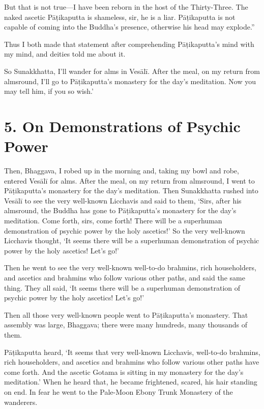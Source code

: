 \documentclass[12pt,openany]{book}%
\begin{document}
But that is not true—I have been reborn in the host of the Thirty-Three. The naked ascetic \textsanskrit{Pāṭikaputta} is shameless, sir, he is a liar. \textsanskrit{Pāṭikaputta} is not capable of coming into the Buddha’s presence, otherwise his head may explode.” 

Thus I both made that statement after comprehending \textsanskrit{Pāṭikaputta}’s mind with my mind, and deities told me about it. 

So Sunakkhatta, I’ll wander for alms in \textsanskrit{Vesālī}. After the meal, on my return from almsround, I’ll go to \textsanskrit{Pāṭikaputta}’s monastery for the day’s meditation. Now you may tell him, if you so wish.’ 

\section*{5. On Demonstrations of Psychic Power }

Then, Bhaggava, I robed up in the morning and, taking my bowl and robe, entered \textsanskrit{Vesālī} for alms. After the meal, on my return from almsround, I went to \textsanskrit{Pāṭikaputta}’s monastery for the day’s meditation. Then Sunakkhatta rushed into \textsanskrit{Vesālī} to see the very well-known Licchavis and said to them, ‘Sirs, after his almsround, the Buddha has gone to \textsanskrit{Pāṭikaputta}’s monastery for the day’s meditation. Come forth, sirs, come forth! There will be a superhuman demonstration of psychic power by the holy ascetics!’ So the very well-known Licchavis thought, ‘It seems there will be a superhuman demonstration of psychic power by the holy ascetics! Let’s go!’ 

Then he went to see the very well-known well-to-do brahmins, rich householders, and ascetics and brahmins who follow various other paths, and said the same thing. They all said, ‘It seems there will be a superhuman demonstration of psychic power by the holy ascetics! Let’s go!’ 

Then all those very well-known people went to \textsanskrit{Pāṭikaputta}’s monastery. That assembly was large, Bhaggava; there were many hundreds, many thousands of them. 

\textsanskrit{Pāṭikaputta} heard, ‘It seems that very well-known Licchavis, well-to-do brahmins, rich householders, and ascetics and brahmins who follow various other paths have come forth. And the ascetic Gotama is sitting in my monastery for the day’s meditation.’ When he heard that, he became frightened, scared, his hair standing on end. In fear he went to the Pale-Moon Ebony Trunk Monastery of the wanderers. 
\end{document}
